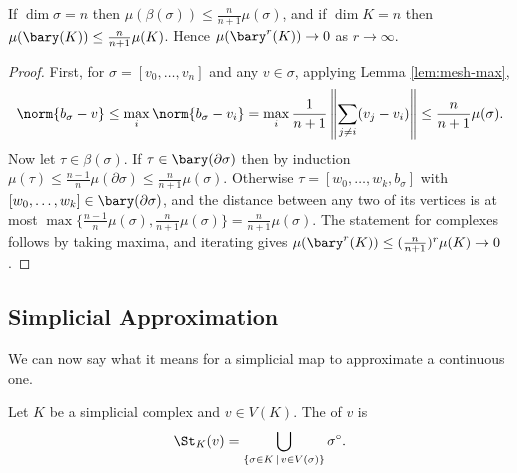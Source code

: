 \begin{corollary} \label{cor:mesh}
	If $\dim\sigma = n$ then $\mu(\beta(\sigma)) \leq \frac{n}{n+1}\mu(\sigma)$, and if $\dim K = n$ then $\mu(\bary(K))\leq\frac{n}{n+1}\mu(K)$. Hence $\mu(\bary^r(K)) \to 0$ as $r \to \infty$.
\end{corollary}
\begin{proof}
	First, for $\sigma = [v_0,\dots,v_n]$ and any $v \in \sigma$, applying Lemma \ref{lem:mesh-max},
	$$
	\norm{b_\sigma - v} \leq \max_i \norm{b_\sigma - v_i} = \max_i \frac{1}{n+1}\left\|\sum_{j\neq i}(v_j - v_i)\right\| \leq \frac{n}{n+1}\mu(\sigma).
	$$
	Now let $\tau \in \beta(\sigma)$. If $\tau \in \bary(\partial\sigma)$ then by induction $\mu(\tau)\leq\frac{n-1}{n}\mu(\partial\sigma)\leq\frac{n}{n+1}\mu(\sigma)$. Otherwise $\tau = [w_0,\dots,w_k,b_\sigma]$ with $[w_0,\dots,w_k] \in \bary(\partial\sigma)$, and the distance between any two of its vertices is at most $\max\{\frac{n-1}{n}\mu(\sigma), \frac{n}{n+1}\mu(\sigma)\} = \frac{n}{n+1}\mu(\sigma)$. The statement for complexes follows by taking maxima, and iterating gives $\mu(\bary^r(K)) \leq (\frac{n}{n+1})^r\mu(K) \to 0$.
\end{proof}

\subsection{Simplicial Approximation}

We can now say what it means for a simplicial map to approximate a continuous one.

\begin{definition}[Star]
	Let $K$ be a simplicial complex and $v \in V(K)$. The  of $v$ is
	$$
	\St_K(v) = \bigcup_{\{\sigma \in K \,\mid\, v \in V(\sigma)\}} \sigma^\circ.
	$$
\end{definition}

\begin{center}
\end{center}

